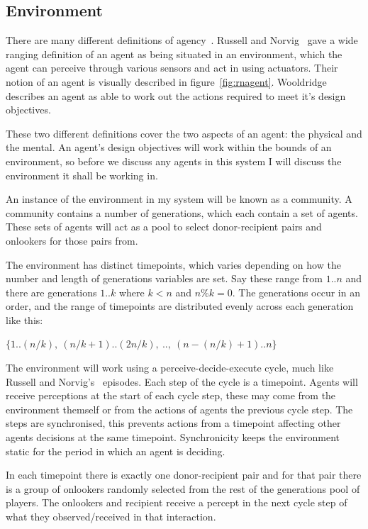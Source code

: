 \documentclass[]{final_report}
\begin{document}
\subsection{Environment}
\label{subs:env}
There are many different definitions of agency~\cite{franklin1996agent}. Russell and Norvig~\cite{russell2016artificial} gave a wide ranging definition of an agent as being situated in an environment, which the agent can perceive through various sensors and act in using actuators. Their notion of an agent is visually described in figure~\ref{fig:rnagent}. Wooldridge~\cite{wooldridge2009introduction} describes an agent as able to work out the actions required to meet it's design objectives.\par
These two different definitions cover the two aspects of an agent: the physical and the mental. An agent's design objectives will work within the bounds of an environment, so before we discuss any agents in this system I will discuss the environment it shall be working in.\par
An instance of the environment in my system will be known as a community. A community contains a number of generations, which each contain a set of agents. These sets of agents will act as a pool to select donor-recipient pairs and onlookers for those pairs from.\par
The environment has distinct timepoints, which varies depending on how the number and length of generations variables are set. Say these range from $1..n$ and there are generations $1..k$ where $k<n$ and $n\%k=0$. The generations occur in an order, and the range of timepoints are distributed evenly across each generation like this:\par \centerline{$\{1..(n/k),\ (n/k+1)..(2n/k),\ ..,\ (n-(n/k)+1)..n\}$}
\par
The environment will work using a perceive-decide-execute cycle, much like Russell and Norvig's~\cite{russell2016artificial} episodes. Each step of the cycle is a timepoint. Agents will receive perceptions at the start of each cycle step, these may come from the environment themself or from the actions of agents the previous cycle step. The steps are synchronised, this prevents actions from a timepoint affecting other agents decisions at the same timepoint. Synchronicity keeps the environment static for the period in which an agent is deciding.\par
In each timepoint there is exactly one donor-recipient pair and for that pair there is a group of onlookers randomly selected from the rest of the generations pool of players. The onlookers and recipient receive a percept in the next cycle step of what they observed/received in that interaction.\par
\end{document}
